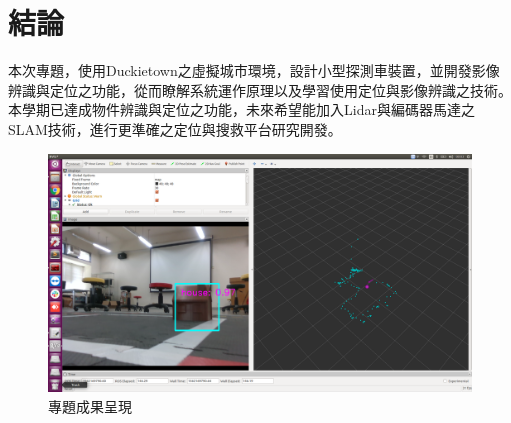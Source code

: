 \section{結論}

本次專題，使用Duckietown之虛擬城市環境，設計小型探測車裝置，並開發影像辨識與定位之功能，從而瞭解系統運作原理以及學習使用定位與影像辨識之技術。本學期已達成物件辨識與定位之功能，未來希望能加入Lidar與編碼器馬達之SLAM技術，進行更準確之定位與搜救平台研究開發。

\begin{figure}[t]
	\centering
	\includegraphics[width=\linewidth,keepaspectratio=true]
	{images/demo.png}
	\caption{專題成果呈現}
	\label{figure:demo_result}
\end{figure}
